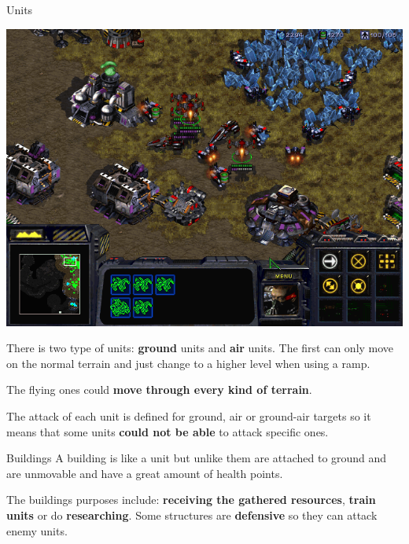 \documentclass[10pt]{beamer}
\begin{document}
\begin{frame}{Units}
\begin{center}
	  \includegraphics[scale=0.2]{sori.png}
\end{center}
There is two type of units: \textbf{ground} units and \textbf{air} units. The first can only move on the normal terrain and just change to a higher level when using a ramp. \newline

The flying ones could\textbf{ move through every kind of terrain}. \newline

The attack of each unit is defined for ground, air or ground-air targets so it means that some units \textbf{could not be able} to attack specific ones.
\end{frame}


\begin{frame}{Buildings}
A building is like a unit but unlike them are attached to ground and are unmovable and have a great amount of health points. \newline

The buildings purposes include: \textbf{receiving the gathered resources}, \textbf{train units} or do \textbf{researching}. Some structures are \textbf{defensive} so they can attack enemy units.
\end{frame}
\end{document}
